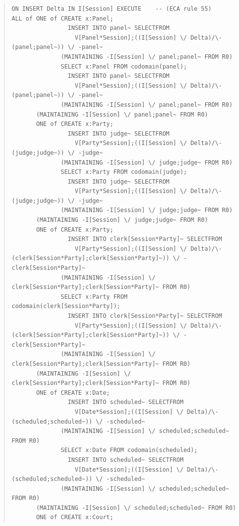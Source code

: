 \documentclass[10pt,a4paper]{report}              %
\theoremstyle{plain}\theorembodyfont{\rmfamily}\newtheorem{definition}{Definition}[section]
\theoremstyle{plain}\theorembodyfont{\rmfamily}\newtheorem{designrule}[definition]{Requirement}
\begin{document}
\begin{quote}
\begin{verbatim}
ON INSERT Delta IN I[Session] EXECUTE    -- (ECA rule 55)
ALL of ONE of CREATE x:Panel;
                INSERT INTO panel~ SELECTFROM
                  V[Panel*Session];((I[Session] \/ Delta)/\-(panel;panel~)) \/ -panel~
              (MAINTAINING -I[Session] \/ panel;panel~ FROM R0)
              SELECT x:Panel FROM codomain(panel);
                INSERT INTO panel~ SELECTFROM
                  V[Panel*Session];((I[Session] \/ Delta)/\-(panel;panel~)) \/ -panel~
              (MAINTAINING -I[Session] \/ panel;panel~ FROM R0)
       (MAINTAINING -I[Session] \/ panel;panel~ FROM R0)
       ONE of CREATE x:Party;
                INSERT INTO judge~ SELECTFROM
                  V[Party*Session];((I[Session] \/ Delta)/\-(judge;judge~)) \/ -judge~
              (MAINTAINING -I[Session] \/ judge;judge~ FROM R0)
              SELECT x:Party FROM codomain(judge);
                INSERT INTO judge~ SELECTFROM
                  V[Party*Session];((I[Session] \/ Delta)/\-(judge;judge~)) \/ -judge~
              (MAINTAINING -I[Session] \/ judge;judge~ FROM R0)
       (MAINTAINING -I[Session] \/ judge;judge~ FROM R0)
       ONE of CREATE x:Party;
                INSERT INTO clerk[Session*Party]~ SELECTFROM
                  V[Party*Session];((I[Session] \/ Delta)/\-(clerk[Session*Party];clerk[Session*Party]~)) \/ -clerk[Session*Party]~
              (MAINTAINING -I[Session] \/ clerk[Session*Party];clerk[Session*Party]~ FROM R0)
              SELECT x:Party FROM codomain(clerk[Session*Party]);
                INSERT INTO clerk[Session*Party]~ SELECTFROM
                  V[Party*Session];((I[Session] \/ Delta)/\-(clerk[Session*Party];clerk[Session*Party]~)) \/ -clerk[Session*Party]~
              (MAINTAINING -I[Session] \/ clerk[Session*Party];clerk[Session*Party]~ FROM R0)
       (MAINTAINING -I[Session] \/ clerk[Session*Party];clerk[Session*Party]~ FROM R0)
       ONE of CREATE x:Date;
                INSERT INTO scheduled~ SELECTFROM
                  V[Date*Session];((I[Session] \/ Delta)/\-(scheduled;scheduled~)) \/ -scheduled~
              (MAINTAINING -I[Session] \/ scheduled;scheduled~ FROM R0)
              SELECT x:Date FROM codomain(scheduled);
                INSERT INTO scheduled~ SELECTFROM
                  V[Date*Session];((I[Session] \/ Delta)/\-(scheduled;scheduled~)) \/ -scheduled~
              (MAINTAINING -I[Session] \/ scheduled;scheduled~ FROM R0)
       (MAINTAINING -I[Session] \/ scheduled;scheduled~ FROM R0)
       ONE of CREATE x:Court;

\end{verbatim}
\end{quote}
\end{document}
